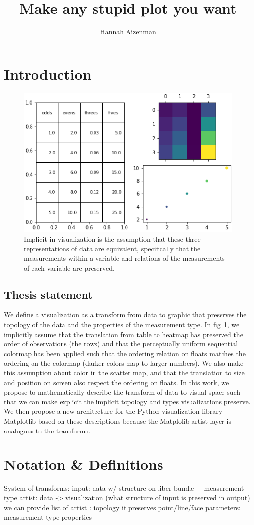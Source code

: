 \documentclass[letterpaper,onecolumn,titlepage]{Ythesis}
\title{Make any stupid plot you want}
\author{Hannah Aizenman}
\begin{document}
\makefrontmatter

\section{Introduction}
\label{sec:introduction}
\begin{figure}
    \includegraphics[width=.5\textwidth]{figures/intro/viz_same.png}
    \caption[]{Implicit in visualization is the assumption that these three representations of data are equivalent, specifically that the measurements within a variable and relations of the measurements of each variable are preserved. }
    \label{fig:viz_same}
\end{figure}

\subsection{Thesis statement}
We define a visualization as a transform from data to graphic that preserves the topology of the data and the properties of the measurement type. In fig~\ref{fig:viz_same}, we implicitly assume that the translation from table to heatmap has preserved the order of observations (the rows) and that the perceptually uniform sequential colormap has been applied such that the ordering relation on floats matches the ordering on the colormap (darker colors map to larger numbers). We also make this assumption about color in the scatter map, and that the translation to size and position on screen also respect the ordering on floats. In this work, we propose to mathematically describe the transform of data to visual space such that we can make explicit the implicit topology and types visualizations preserve. We then propose a new architecture for the Python visualization library Matplotlib \cite{hunterMatplotlib2DGraphics2007} based on these descriptions because the Matplolib artist layer is analogous to the transforms. 


\section{Notation \& Definitions}
System of transforms:
input: data w/ structure on fiber bundle + measurement type
artist: data -> visualization
(what structure of input is preserved in output)
we can provide list of
artist : topology it preserves
point/line/face parameters: measurement type properties 
\end{document}
